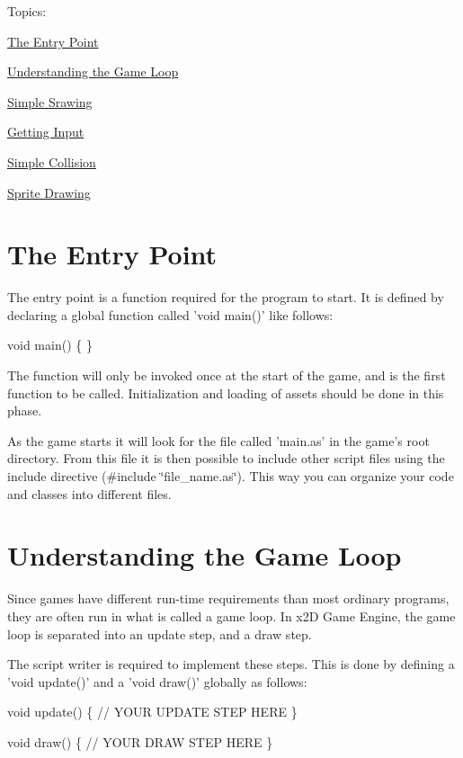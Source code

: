 Topics\+:
\begin{DoxyItemize}
\item \hyperlink{main}{The Entry Point}
\item \hyperlink{gameloop}{Understanding the Game Loop}
\item \hyperlink{drawing}{Simple Srawing}
\item \hyperlink{input}{Getting Input}
\item \hyperlink{collision}{Simple Collision}
\item \hyperlink{sprites}{Sprite Drawing} 
\end{DoxyItemize}\hypertarget{main}{}\section{The Entry Point}\label{main}
The entry point is a function required for the program to start. It is defined by declaring a global function called 'void main()' like follows\+:


\begin{DoxyCode}
\textcolor{keywordtype}{void} main()
\{
\}
\end{DoxyCode}


The function will only be invoked once at the start of the game, and is the first function to be called. Initialization and loading of assets should be done in this phase.

As the game starts it will look for the file called 'main.\+as' in the game's root directory. From this file it is then possible to include other script files using the include directive (\#include \char`\"{}file\+\_\+name.\+as\char`\"{}). This way you can organize your code and classes into different files. \hypertarget{gameloop}{}\section{Understanding the Game Loop}\label{gameloop}
Since games have different run-\/time requirements than most ordinary programs, they are often run in what is called a game loop. In x2\+D Game Engine, the game loop is separated into an update step, and a draw step.

The script writer is required to implement these steps. This is done by defining a 'void update()' and a 'void draw()' globally as follows\+:


\begin{DoxyCode}
\textcolor{keywordtype}{void} update()
\{
    \textcolor{comment}{// YOUR UPDATE STEP HERE}
\}

\textcolor{keywordtype}{void} draw()
\{
    \textcolor{comment}{// YOUR DRAW STEP HERE}
\}
\end{DoxyCode}


